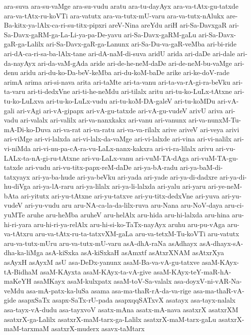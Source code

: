 {ara-suva
ara-su-vaMge
ara-su-vudu
aratu
ara-tu-dayAyx
ara-va-tAtx-gu-tatxde
ara-va-tAtx-ru-koVTi
ara-vatutx
ara-va-tutx-mU-varu
ara-va-tutx-nAlukx
are-Ba-kitx-ya-lAlx-ca-ri-su-titx-pipxri
areV-Nina
areYdu
ariH
ari-Sa-DavxgaR
ari-Sa-Davx-gaRM-ga-La-Li-ya-pa-De-yavu
ari-Sa-Davx-gaRM-gaLu
ari-Sa-Davx-gaR-ga-Lalilx
ari-Sa-Davx-gaR-ga-Lanunx
ari-Sa-Du-va-gaR-veMba
ari-bi-ride
ari-dA-ca-ri-sa-ba-lAlx-tane
ari-dA-naM-di-suva
aridU
arida
ari-daDe
ari-dale
ari-da-nayAyx
ari-da-vaM-gAda
aride
ari-de-he-neM-daDe
ari-de-neM-bu-vaMge
ari-denu
aridu
ari-du-ko-Da-beV-keMba
ari-du-koM-baDe
arike
ari-ke-doV-rade
arimA
arima
ari-si-nava
arita
ari-taMte
ari-ta-vanu
ari-ta-va-rA-gi-ra-beVku
ari-ta-varu
ari-ti-dedxVne
ari-ti-he-neMdu
ari-tilalx
aritu
ari-tu-ko-LuLx-tAtxne
ari-tu-ko-LuLxva
ari-tu-ko-LuLx-vudu
ari-tu-koM-DA-galeV
ari-tu-koMDu
ari-vA-gali
ari-vAgi
ari-vA-gipapx
ari-vA-gu-tatxde
ari-vA-gu-vudeV
arivU
ariva
ari-vadu
ari-valalx
ari-valilx
ari-va-nanxkakx
ari-vanu
ari-vanunx
ari-va-nunxM-Tu-mA-Di-ko-Duva
ari-va-rat
ari-va-ratu
ari-va-va-rilalx
arive
ariveV
ari-veya
arivi
ari-viMge
ari-vi-lalxda
ari-vi-lalx-da-vaMge
ari-vi-lalxde
ari-vina
ari-vi-nalilx
ari-vi-niMda
ari-vi-nu-pa-cA-ra-vu-LaLx-nanx-kakxra
ari-vi-ra-lilalx
arivu
ari-vu-LALx-ta-nA-gi-ru-tAtxne
ari-vu-LaLx-vanu
ari-vuM-TA-dAga
ari-vuM-TA-gu-tatxde
ari-vudu
ari-vu-titx-papx-reM-daDe
ari-ya-bA-radu
ari-ya-baM-di-tatxyayx
ari-ya-ba-hude
ari-ya-beVku
ari-yada
ari-yade
ari-ya-di-dadxre
ari-ya-di-hu-diVga
ari-ya-lA-raru
ari-ya-lilalx
ari-ya-li-lalxda
ari-yalu
ari-yaru
ari-ye-neM-bAta
ari-yitutx
ari-yu-tAtxne
ari-yu-tatxve
ari-yu-titx-dedxVne
ari-yuva
ari-yu-vudeV
ari-yu-vudu
aru
aru-NA-ca-la-da-lilx-ruva
aru-Nana
aru-NoV-daya
aru-ci-yuMTe
aruhe
aru-heMba
aruheV
aru-helAlx
aru-hida
aru-hi-lalxda
aru-hina
aru-hi-ri-yara
aru-hi-ri-ya-relAlx
aru-hi-si-ko-TaTx-nayAyx
aruhu
aru-pu-vAga
aru-va-tAtxru
aru-va-tAtx-ru-ta-tatxvXM-gaLa
aru-va-tetxM-Tu-koVTi
aru-vatutx
aru-va-tutx-mUru
aru-va-tutx-mU-varu
asA-dhA-raNa
asAdhayx
asA-dhayx-sA-dha-ka-liMga
asA-kiSxka
asA-kiSxkaH
asAmxtf
asAtxrXNAM
asAtxrXya
asAyxH
asAyxM
asU
asa-DeDx-yanunx
asaM-Ba-va-vA-gu-tatxve
asaM-KAyx-tA-BidhaM
asaM-KAyxta
asaM-KAyx-ta-vA-give
asaM-KAyx-teY-maR-hA-maKeYH
asaMKayx
asaM-kulxpatx
asaM-toV-Sa-valalx
asa-doyxV-ni-vAR-Na-veMdu
asa-mA-patx-ka-luSa
asama
asa-ma-thaR-rA-da-va-rige
asa-ma-thaR-vA-gide
asapxSaTx
asapx-SaTx-rU-pada
asapxqqSATxvX
asatayx
asa-tayx-nalalx
asa-tayx-vA-dudu
asa-tayxvoV
asatx-mAna
asatx-mA-nava
asatxrX
asatxrXM
asatxrX-ga-Lalilx
asatxrX-maM-tarx-ga-Lalilx
asatxrX-maM-tarx-gaLu
asatxrX-maM-tarxmaM
asatxrX-muderx
asavx-taMtarx
}
